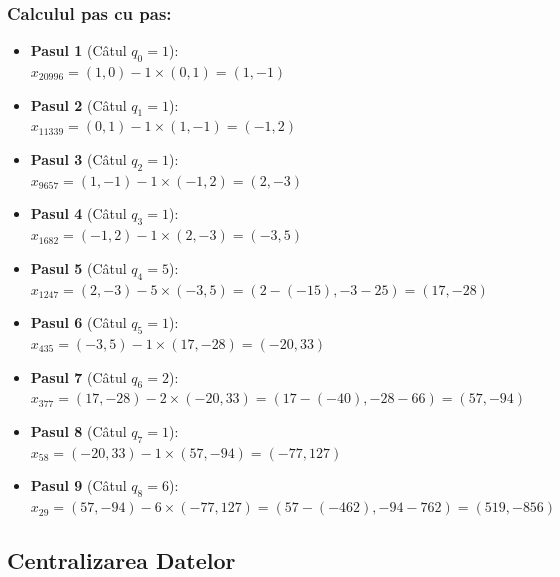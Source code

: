 \documentclass[12pt]{article}
\begin{document}
\subsubsection*{Calculul pas cu pas:}
\begin{itemize}
    \item \textbf{Pasul 1} (Câtul $q_0 = 1$): \\
    $x_{20996} = (1, 0) - 1 \times (0, 1) = (1, -1)$
    
    \item \textbf{Pasul 2} (Câtul $q_1 = 1$): \\
    $x_{11339} = (0, 1) - 1 \times (1, -1) = (-1, 2)$
    
    \item \textbf{Pasul 3} (Câtul $q_2 = 1$): \\
    $x_{9657} = (1, -1) - 1 \times (-1, 2) = (2, -3)$
    
    \item \textbf{Pasul 4} (Câtul $q_3 = 1$): \\
    $x_{1682} = (-1, 2) - 1 \times (2, -3) = (-3, 5)$
    
    \item \textbf{Pasul 5} (Câtul $q_4 = 5$): \\
    $x_{1247} = (2, -3) - 5 \times (-3, 5) = (2 - (-15), -3 - 25) = (17, -28)$
    
    \item \textbf{Pasul 6} (Câtul $q_5 = 1$): \\
    $x_{435} = (-3, 5) - 1 \times (17, -28) = (-20, 33)$
    
    \item \textbf{Pasul 7} (Câtul $q_6 = 2$): \\
    $x_{377} = (17, -28) - 2 \times (-20, 33) = (17 - (-40), -28 - 66) = (57, -94)$
    
    \item \textbf{Pasul 8} (Câtul $q_7 = 1$): \\
    $x_{58} = (-20, 33) - 1 \times (57, -94) = (-77, 127)$
    
    \item \textbf{Pasul 9} (Câtul $q_8 = 6$): \\
    $x_{29} = (57, -94) - 6 \times (-77, 127) = (57 - (-462), -94 - 762) = (519, -856)$
\end{itemize}

\subsection*{ Centralizarea Datelor}
\end{document}
